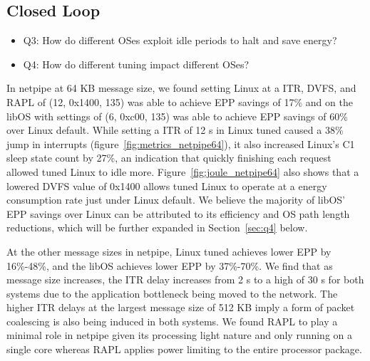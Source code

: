\subsection{Closed Loop}
\label{sec:q1}
\begin{itemize}
\item Q3: How do different OSes exploit idle periods to halt and save energy?
\item Q4: How do different tuning impact different OSes?
\end{itemize}


In netpipe at 64 KB message size, we found setting Linux at a ITR, DVFS, and RAPL of (12, 0x1400, 135) was able to achieve EPP savings of 17\% and on the libOS with settings of (6, 0xc00, 135) was able to achieve EPP savings of 60\% over Linux default. While setting a ITR of 12 \micro s in Linux tuned caused a 38\% jump in interrupts (figure~\ref{fig:metrics_netpipe64}), it also increased Linux's C1 sleep state count by 27\%, an indication that quickly finishing each request allowed tuned Linux to idle more. Figure~\ref{fig:joule_netpipe64} also shows that a lowered DVFS value of 0x1400 allows tuned Linux to operate at a energy consumption rate just under Linux default. We believe the majority of libOS' EPP savings over Linux can be attributed to its efficiency and OS path length reductions, which will be further expanded in Section~\ref{sec:q4} below. %

At the other message sizes in netpipe, Linux tuned achieves lower EPP by 16\%-48\%, and the libOS achieves lower EPP by 37\%-70\%. We find that as message size increases, the ITR delay increases from 2 \micro s to a high of 30 \micro s for both systems due to the application bottleneck being moved to the network. The higher ITR delays at the largest message size of 512 KB imply a form of packet coalescing is also being induced in both systems. We found RAPL to play a minimal role in netpipe given its processing light nature and only running on a single core whereas RAPL applies power limiting to the entire processor package.

